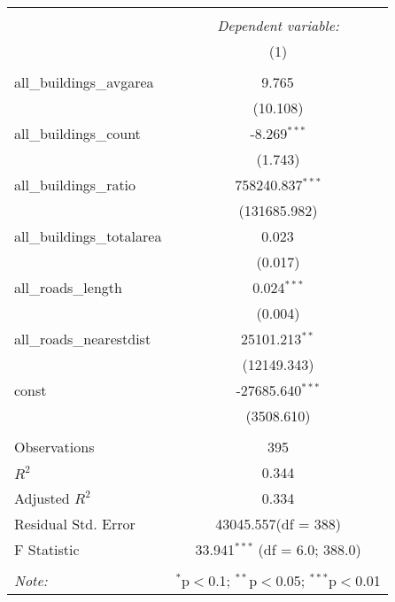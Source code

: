 \begin{table}[!htbp] \centering
\begin{tabular}{@{\extracolsep{5pt}}lc}
\\[-1.8ex]\hline
\hline \\[-1.8ex]
& \multicolumn{1}{c}{\textit{Dependent variable:}} \
\cr \cline{1-2}
\\[-1.8ex] & (1) \\
\hline \\[-1.8ex]
 all_buildings_avgarea & 9.765$^{}$ \\
  & (10.108) \\
 all_buildings_count & -8.269$^{***}$ \\
  & (1.743) \\
 all_buildings_ratio & 758240.837$^{***}$ \\
  & (131685.982) \\
 all_buildings_totalarea & 0.023$^{}$ \\
  & (0.017) \\
 all_roads_length & 0.024$^{***}$ \\
  & (0.004) \\
 all_roads_nearestdist & 25101.213$^{**}$ \\
  & (12149.343) \\
 const & -27685.640$^{***}$ \\
  & (3508.610) \\
\hline \\[-1.8ex]
 Observations & 395 \\
 $R^2$ & 0.344 \\
 Adjusted $R^2$ & 0.334 \\
 Residual Std. Error & 43045.557(df = 388)  \\
 F Statistic & 33.941$^{***}$ (df = 6.0; 388.0) \\
\hline
\hline \\[-1.8ex]
\textit{Note:} & \multicolumn{1}{r}{$^{*}$p$<$0.1; $^{**}$p$<$0.05; $^{***}$p$<$0.01} \\
\end{tabular}
\end{table}